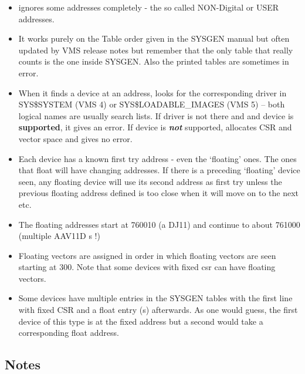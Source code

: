 \begin{itemize}

\item ignores some addresses completely - the so called NON-Digital or USER
addresses.

\item It works purely on the Table order given in the SYSGEN manual
but often updated by VMS release notes but remember that the only table
that really counts is the one inside SYSGEN. Also the printed tables are
sometimes in error.

\item When it finds a device at an address, looks for the
corresponding driver in SYS\$SYSTEM (VMS 4) or SYS\$LOADABLE\_IMAGES (VMS 5)
-- both logical names are usually search lists.
If driver is not there and
and device is {\bf supported}, it gives an error.
If device is {\bf\it not} supported, allocates CSR and vector space and
gives no error.

\item Each device has a known first try address - even the `floating'
ones. The ones that float will have changing addresses. If there
is a preceding `floating' device seen, any floating device will
use its second address as first try unless the previous floating
address defined is too close when it will move on to the next etc.

\item The floating addresses start at 760010 (a DJ11) and continue to
about 761000 (multiple AAV11D s !)

\item Floating vectors are assigned in order in which floating vectors
are seen starting at 300. Note that some devices with fixed csr can
have floating vectors.

\item Some devices have multiple entries in the SYSGEN tables with
the first line with fixed CSR and a float entry (s) afterwards.
As one would guess, the first device of this type is at the fixed
address but a second would take a corresponding float address.
\end{itemize}

\subsection{Notes}

